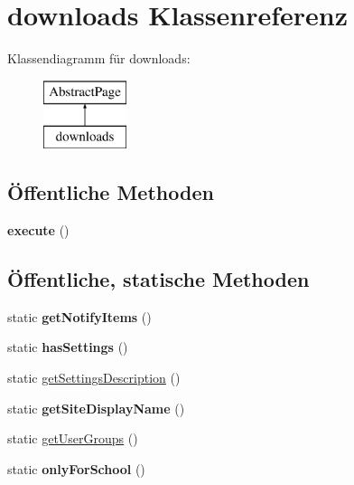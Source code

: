 \hypertarget{classdownloads}{}\section{downloads Klassenreferenz}
\label{classdownloads}
Klassendiagramm für downloads\+:\begin{figure}[H]
\begin{center}
\leavevmode
\includegraphics[height=2.000000cm]{classdownloads}
\end{center}
\end{figure}
\subsection*{Öffentliche Methoden}
\begin{DoxyCompactItemize}
\item 
\mbox{\label{classdownloads_a6dee9a7a21f0361cf9ee6bd0fed30d2c}} 
{\bfseries execute} ()
\end{DoxyCompactItemize}
\subsection*{Öffentliche, statische Methoden}
\begin{DoxyCompactItemize}
\item 
\mbox{\label{classdownloads_ab0874a926b9e80e60a0041f4abfb6913}} 
static {\bfseries get\+Notify\+Items} ()
\item 
\mbox{\label{classdownloads_ab834dad04642f7524160e91dd43b5e1e}} 
static {\bfseries has\+Settings} ()
\item 
static \mbox{\hyperlink{classdownloads_a109b0a4df8dc75bc95c95a51726db27d}{get\+Settings\+Description}} ()
\item 
\mbox{\label{classdownloads_aa578adf75c0b77b4ad5661005539c788}} 
static {\bfseries get\+Site\+Display\+Name} ()
\item 
static \mbox{\hyperlink{classdownloads_af9aa70ddcc1375cff89835c4a5a18198}{get\+User\+Groups}} ()
\item 
\mbox{\label{classdownloads_acd48195bef47e824a521dadf6093067b}} 
static {\bfseries only\+For\+School} ()
\end{DoxyCompactItemize}
